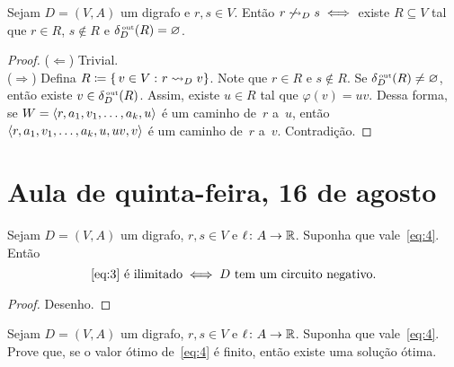 \documentclass[10pt,reqno]{amsart}
\begin{document}
\begin{theorem}
  \label{thm:1}
  Sejam \(D = (V,A)\) um digrafo e \(r,s \in V\).  Então
  \(r \not\reaches_D s \iff\) existe \(R \subseteq V\) tal que
  \(r \in R\), \(s \not\in R\) e \(\deltaout[D](R) = \emptyset\).
\end{theorem}
\begin{proof}
  (\(\Leftarrow\)) Trivial.
  \\
  (\(\Rightarrow\)) Defina \(R \coloneqq \setst{v \in V}{r \reaches_D v}\).
  Note que \(r \in R\) e \(s \notin R\). Se \(\deltaout[D](R) \neq \emptyset\),
  então existe \(v \in \deltaout[D](R)\). Assim, existe \(u \in R\) tal que
  \(\varphi(v) = uv\). Dessa forma, se \(W = \seq{r,a_1,v_1,\dotsc,a_k,u}\)
  é um caminho de~\(r\) a~\(u\), então \(\seq{r,a_1,v_1,\dotsc,a_k,u,uv,v}\)
  é um caminho de~\(r\) a~\(v\). Contradição.
\end{proof}

\section{Aula de quinta-feira, 16 de agosto}

\begin{proposition}
  \label{prop:2}
  Sejam \(D = (V,A)\) um digrafo, \(r,s \in V\) e
  \(\ell \colon A \to \Reals\). Suponha que vale~\eqref{eq:4}.
  Então
  \begin{equation}
    \label{eq:6}
    \text{\eqref{eq:3} é ilimitado}
    \iff
    \text{\(D\) tem um circuito negativo}.
  \end{equation}
\end{proposition}
\begin{proof} Desenho.
  
\end{proof}

\begin{exercise}
  \label{ex:4}
  Sejam \(D = (V,A)\) um digrafo, \(r,s \in V\) e
  \(\ell \colon A \to \Reals\).  Suponha que vale~\eqref{eq:4}.
  Prove que, se o valor ótimo de~\eqref{eq:4} é finito, então
  existe uma solução ótima.
\end{exercise}
\end{document}
